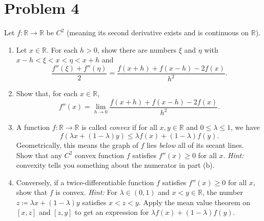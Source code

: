 \documentclass[11pt]{article}
\begin{document}
\section{Problem 4}
    Let $f : \mathbb{R} \to \mathbb{R}$ be $C^2$ (meaning its second derivative exists and is continuous on $\mathbb{R}$).
    \begin{enumerate}[label=(\alph*)]
        \item 
        Let $x \in \mathbb{R}$. For each $h > 0$, show there are numbers $\xi$ and $\eta$ with $x - h < \xi < x < \eta < x + h$ and
        \begin{equation*}
            \frac{f''(\xi) + f''(\eta)}{2} = \frac{f(x + h) + f(x - h) - 2f(x)}{h^2}.
        \end{equation*}
        
        \item 
        Show that, for each $x \in \mathbb{R}$,
        \begin{equation*}
            f''(x) = \lim_{h \to 0} \frac{f(x + h) + f(x - h) - 2f(x)}{h^2}.
        \end{equation*}

        \item 
        A function $f : \mathbb{R} \to \mathbb{R}$ is called \textit{convex} if for all $x, y \in \mathbb{R}$ and $0 \leq \lambda \leq 1$, we have
        \begin{equation*}
            f(\lambda x + (1 - \lambda)y) \leq \lambda f(x) + (1 - \lambda) f(y).
        \end{equation*}
        Geometrically, this means the graph of $f$ lies \textit{below} all of its secant lines. Show that any $C^2$ convex function $f$ satisfies $f''(x) \geq 0$ for all $x$. \textit{Hint:} convexity tells you something about the numerator in part (b).

        \item 
        Conversely, if a twice-differentiable function $f$ satisfies $f''(x) \geq 0$ for all $x$, show that $f$ is convex. \textit{Hint:} For $\lambda \in (0, 1)$ and $x < y \in \mathbb{R}$, the number $z \coloneqq \lambda x + (1 - \lambda)y$ satisfies $x < z < y$. Apply the mean value theorem on $[x, z]$ and $[z, y]$ to get an expression for $\lambda f(x) + (1 - \lambda) f(y)$.
        
    \end{enumerate}
    
\end{document}
